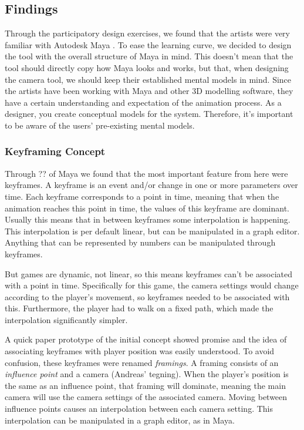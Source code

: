 \subsection{Findings}
Through the participatory design exercises, we found that the artists were very familiar with Autodesk Maya \cite{MayaSource}. To ease the learning curve, we decided to design the tool with the overall structure of Maya in mind. This doesn't mean that the tool should directly copy how Maya looks and works, but that, when designing the camera tool, we should keep their established mental models \cite{mentalModels} in mind. Since the artists have been working with Maya and other 3D modelling software, they have a certain understanding and expectation of the animation process. As a designer, you create conceptual models for the system. Therefore, it's important to be aware of the users' pre-existing mental models.

\subsubsection{Keyframing Concept}
Through ?? of Maya we found that the most important feature from here were keyframes.
A keyframe is an event and/or change in one or more parameters over time. Each keyframe corresponds to a point in time, meaning that when the animation reaches this point in time, the values of this keyframe are dominant. Usually this means that in between keyframes some interpolation is happening. This interpolation is per default linear, but can be manipulated in a graph editor. Anything that can be represented by numbers can be manipulated through keyframes.

But games are dynamic, not linear, so this means keyframes can't be associated with a point in time. Specifically for this game, the camera settings would change according to the player's movement, so keyframes needed to be associated with this. Furthermore, the player had to walk on a fixed path, which made the interpolation significantly simpler.

A quick paper prototype of the initial concept showed promise and the idea of associating keyframes with player position was easily understood. To avoid confusion, these keyframes were renamed \textit{framings}. A framing consists of an \textit{influence point} and a camera (Andreas' tegning). When the player's position is the same as an influence point, that framing will dominate, meaning the main camera will use the camera settings of the associated camera. Moving between influence points causes an interpolation between each camera setting. This interpolation can be manipulated in a graph editor, as in Maya.
